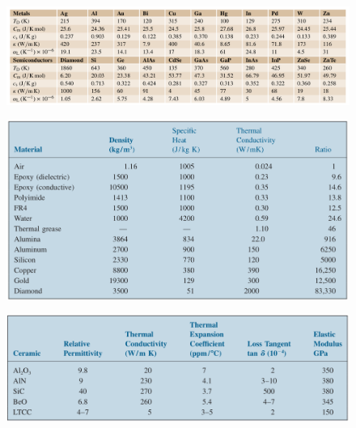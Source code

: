 \documentclass[final]{cubedoc}
\begin{document}
	\begin{figure}[h!]
		\centering
		\includegraphics[width=\linewidth]{docs/table_properties_springer.png}
		\caption{\cite[p.428]{kasap2017springer}}
		\label{fig:metal_table_2}
	\end{figure}
	
	\begin{figure}[h!]
		\centering
		\includegraphics[width=\linewidth]{docs/table_properties_bible.png}
		\caption{\cite[p.222]{tummala2001fundamentals}}
		\label{fig:fr4properties}
	\end{figure}
	
	\begin{figure}[h!]
		\centering
		\includegraphics[width=\linewidth]{docs/table_ceramics_bible.png}
		\caption{\cite[p.718]{tummala2001fundamentals}}
		\label{fig:my_label}
	\end{figure}
	
	
	
\end{document}
